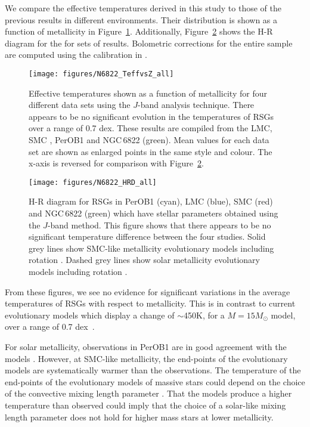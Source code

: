 \documentclass[iop]{emulateapj}
\begin{document}
We compare the effective temperatures derived in this study to those of the previous results in different environments.
Their distribution is shown as a function of metallicity in Figure~\ref{fig:TvsZ}.
Additionally, Figure~\ref{fig:HRD} shows the H-R diagram for the for sets of results.
Bolometric corrections for the entire sample are computed using the calibration in
\cite{2013ApJ...767....3D}.


\begin{figure}
\texttt{[image: figures/N6822\_TeffvsZ\_all]}
\caption{
Effective temperatures shown as a function of metallicity for four different data sets using the $J$-band analysis technique.
There appears to be no significant evolution in the temperatures of RSGs over a range of 0.7 dex.
These results are compiled from the LMC, SMC
\protect\citep[blue and red points respectively;][]{Davies-prep}, PerOB1
\protect\citep[a Galactic RSG cluster; cyan;][]{2014ApJ...788...58G} and NGC\,6822 (green).
Mean values for each data set are shown as enlarged points in the same style and colour.
The x-axis is reversed for comparison with Figure~\ref{fig:HRD}.\label{fig:TvsZ}
         }
\end{figure}

\begin{figure}
\texttt{[image: figures/N6822\_HRD\_all]}
\caption{
H-R diagram for RSGs in PerOB1 (cyan), LMC (blue), SMC (red) and NGC\,6822 (green) which have stellar parameters obtained using the $J$-band method.
This figure shows that there appears to be no significant temperature difference between the four studies.
Solid grey lines show SMC-like metallicity evolutionary models including rotation
\protect\citep{2013A&A...558A.103G}.
Dashed grey lines show solar metallicity evolutionary models including rotation
\protect\citep{2012A&A...537A.146E}.\label{fig:HRD}
        }
\end{figure}


From these figures, we see no evidence for significant variations in the average temperatures of RSGs with respect to metallicity.
This is in contrast to current evolutionary models which display a change of $\sim$450K,
for a $M=15M_{\odot}$ model,
over a range of 0.7 dex~\citep{2012A&A...537A.146E,2013A&A...558A.103G}.

For solar metallicity, observations in PerOB1 are in good agreement with the models
\citep[see Figure 9 in][]{2014ApJ...788...58G}.
However, at SMC-like metallicity, the end-points of the evolutionary models are systematically warmer than the observations.
The temperature of the end-points of the evolutionary models of massive stars could depend on the choice of the convective mixing length parameter
\citep{1992A&AS...96..269S}.
That the models produce a higher temperature than observed could imply that the choice of a solar-like mixing length parameter does not hold for higher mass stars at lower metallicity.
\end{document}
